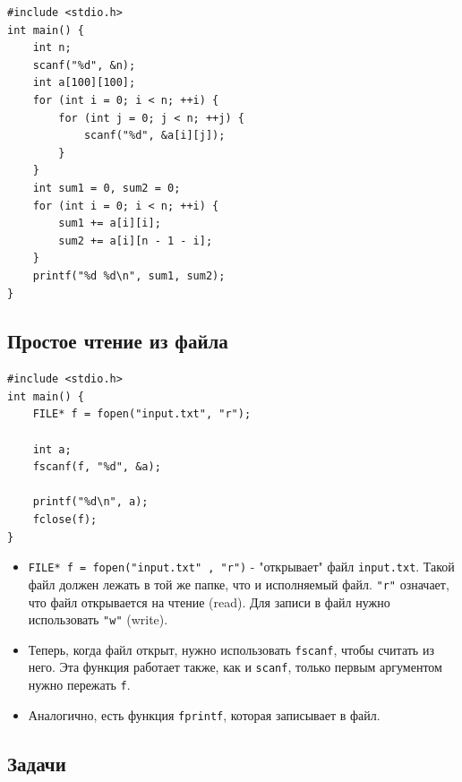 \documentclass{article}
\begin{document}
\begin{itemize}
\begin{lstlisting}[backgroundcolor = \color{solcolor}]
#include <stdio.h>
int main() {
    int n;
    scanf("%d", &n);
    int a[100][100];
    for (int i = 0; i < n; ++i) {
        for (int j = 0; j < n; ++j) {
            scanf("%d", &a[i][j]);
        }
    }
    int sum1 = 0, sum2 = 0;
    for (int i = 0; i < n; ++i) {
        sum1 += a[i][i];
        sum2 += a[i][n - 1 - i];
    }
    printf("%d %d\n", sum1, sum2);
}
\end{lstlisting}

\end{itemize}

\newpage
\subsection*{Простое чтение из файла}

\begin{lstlisting}
#include <stdio.h>
int main() {
    FILE* f = fopen("input.txt", "r");
    
    int a;
    fscanf(f, "%d", &a);
    
    printf("%d\n", a);
    fclose(f);
}
\end{lstlisting}

\begin{itemize}
\item \texttt{FILE* f = fopen("input.txt"\,, "r")} - "открывает" файл \texttt{input.txt}. Такой файл должен лежать в той же папке, что и исполняемый файл. \texttt{"r"} означает, что файл открывается на чтение (read). Для записи в файл нужно использовать \texttt{"w"} (write).
\item Теперь, когда файл открыт, нужно использовать \texttt{fscanf}, чтобы считать из него. Эта функция работает также, как и \texttt{scanf}, только первым аргументом нужно пережать \texttt{f}.
\item Аналогично, есть функция \texttt{fprintf}, которая записывает в файл.
\end{itemize}

\subsection*{Задачи}
\end{document}
